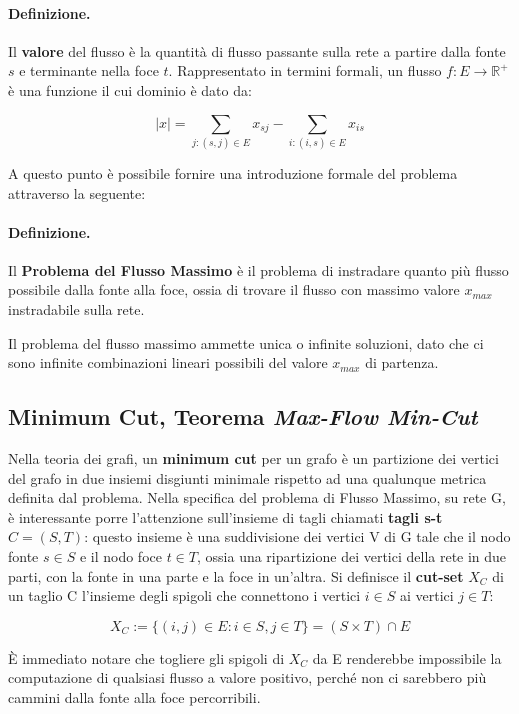 \documentclass{article}
\begin{document}
\paragraph{Definizione.} Il \textbf{valore} del flusso è la quantità di flusso passante sulla rete a partire dalla fonte $s$ e terminante nella foce $t$. Rappresentato in 
termini formali, un flusso $f : E \rightarrow \mathbb{R}^+$ è una funzione il cui dominio è dato da:

\[ \lvert x \rvert = \sum_{j: (s,j) \in E} x_{sj} - \sum_{i: (i,s) \in E} x_{is}\]

A questo punto è possibile fornire una introduzione formale del problema attraverso la seguente:\\
\pagebreak

\paragraph{Definizione.} Il \textbf{Problema del Flusso Massimo} è il problema di instradare quanto più flusso possibile dalla fonte alla foce, ossia di trovare il flusso con massimo valore $x_{max}$ instradabile sulla rete.

Il problema del flusso massimo ammette unica o infinite soluzioni, dato che ci sono infinite combinazioni lineari possibili del valore $x_{max}$ di partenza.


\subsection{Minimum Cut, Teorema \emph{Max-Flow Min-Cut}} \label{min-cut}
Nella teoria dei grafi, un \textbf{minimum cut} per un grafo è un partizione dei vertici del grafo in due insiemi disgiunti minimale rispetto
ad una qualunque metrica definita dal problema. Nella specifica del problema di Flusso Massimo, su rete G, è interessante porre l'attenzione sull'insieme di tagli chiamati 
\textbf{tagli s-t} $C = (S,T)$: questo insieme è una suddivisione dei vertici V di G tale che il nodo fonte $s \in S$ e il nodo foce $t \in T$, ossia una ripartizione dei vertici
della rete in due parti, con la fonte in una parte e la foce in un'altra. 
Si definisce il \textbf{cut-set} $X_C$ di un taglio C l'insieme degli spigoli che connettono i vertici $i \in S$ ai vertici $j \in T$:

\[X_C := \{(i, j) \in E : i \in S, j \in T \} = (S \times T) \cap E\]

È immediato notare che togliere gli spigoli di $X_C$ da E renderebbe impossibile la computazione di qualsiasi flusso a valore positivo, perché non ci sarebbero più cammini dalla 
fonte alla foce percorribili.
\end{document}
